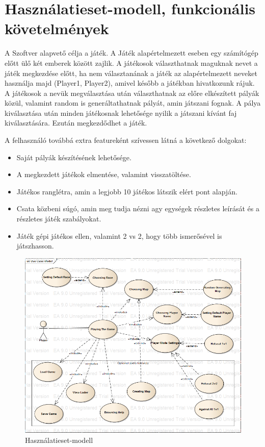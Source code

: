 \documentclass[a4paper,12pt]{report}
\begin{document}
\section{Használatieset-modell, funkcionális követelmények}

A Szoftver alapvető célja a játék. A Játék alapértelmezett eseben egy számítógép előtt ülő két emberek között zajlik. A játékosok választhatnak maguknak nevet a játék megkezdése előtt,
ha nem választanának a játék az alapértelmezett neveket használja majd (Player1, Player2), amivel később a játékban hivatkozunk rájuk. A játékosok a nevük megválasztása után választhatnak az előre elkészített pályák közül, valamint random is generáltathatnak pályát, amin játszani fognak. A pálya kiválasztása után minden játékosnak
lehetősége nyilik a játszani kívánt faj kiválasztására. Ezután megkezdődhet a játék.

A felhasználó továbbá extra featureként szívessen látná a következő dolgokat:
\begin{itemize}
\item Saját pályák készítésének lehetősége.
\item A megkezdett játékok elmentése, valamint visszatöltése.
\item Játékos ranglétra, amin a legjobb 10 játékos látszik elért pont alapján.
\item Csata közbeni súgó, amin meg tudja nézni agy egységek részletes leírását és a részletes játék szabályokat.
\item Játék gépi játékos ellen, valamint 2 vs 2, hogy több ismerősével is játszhasson.
\end{itemize} 

\begin{figure}[hbtp]
\centering
\includegraphics[width=1\textwidth]{UseCaseModel.png}
\caption{Használatieset-modell}
\label{fig:hmm}
\end{figure}
\end{document}
